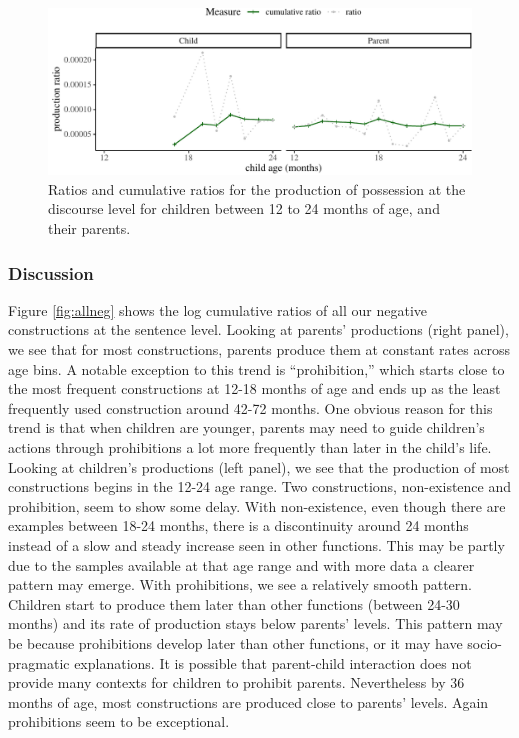 \documentclass[
  english,
  man,floatsintext]{apa6}
\begin{document}
\begin{figure}[H]

{\centering \includegraphics{neg_construction_article_files/figure-latex/possessiondiscoursebegin-1} 

}

\caption{Ratios and cumulative ratios for the production of possession at the discourse level for children between 12 to 24 months of age, and their parents.}\label{fig:possessiondiscoursebegin}
\end{figure}

\hypertarget{discussion}{%
\subsubsection{Discussion}\label{discussion}}

Figure \ref{fig:allneg} shows the log cumulative ratios of all our negative constructions at the sentence level. Looking at parents' productions (right panel), we see that for most constructions, parents produce them at constant rates across age bins. A notable exception to this trend is ``prohibition,'' which starts close to the most frequent constructions at 12-18 months of age and ends up as the least frequently used construction around 42-72 months. One obvious reason for this trend is that when children are younger, parents may need to guide children's actions through prohibitions a lot more frequently than later in the child's life. Looking at children's productions (left panel), we see that the production of most constructions begins in the 12-24 age range. Two constructions, non-existence and prohibition, seem to show some delay. With non-existence, even though there are examples between 18-24 months, there is a discontinuity around 24 months instead of a slow and steady increase seen in other functions. This may be partly due to the samples available at that age range and with more data a clearer pattern may emerge. With prohibitions, we see a relatively smooth pattern. Children start to produce them later than other functions (between 24-30 months) and its rate of production stays below parents' levels. This pattern may be because prohibitions develop later than other functions, or it may have socio-pragmatic explanations. It is possible that parent-child interaction does not provide many contexts for children to prohibit parents. Nevertheless by 36 months of age, most constructions are produced close to parents' levels. Again prohibitions seem to be exceptional.
\end{document}
